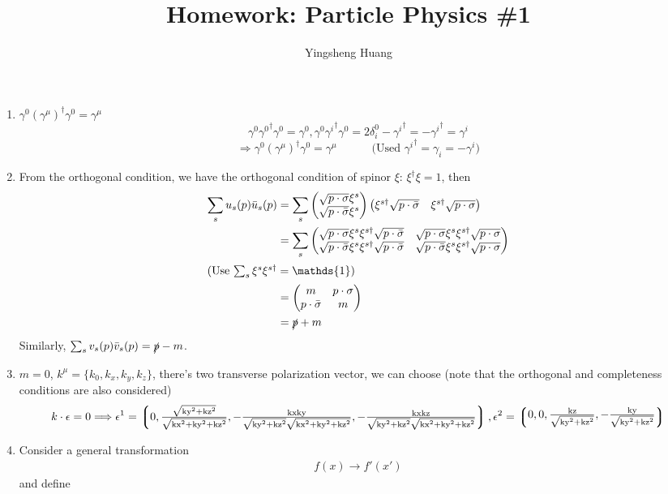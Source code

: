 \documentclass{article}
\title{Homework: Particle Physics \#1}
\author{Yingsheng Huang}
\newcommand{\gm}{\gamma^{\mu}}
\newcommand{\g}{\gamma}
\newcommand{\p}{\phi}
\newcommand{\ps}{\slashed p}
\begin{document}
\maketitle
\begin{enumerate}[\bf1.]
  \item $\g^0(\gm)^{\dagger}\g^0=\gm$
  $$\g^0{\g^0}^{\dagger}\g^0=\g^0,\g^0{\g^i}^{\dagger}\g^0=2\delta^0_i-{\g^i}^{\dagger}=-{\g^i}^{\dagger}=\g^i$$
  $$\Longrightarrow \g^0(\gm)^{\dagger}\g^0=\gm\;\;\;\;\;\;\;\;\;\;\;\text{(Used ${\g^i}^{\dagger}=\g_i=-\g^i$)}$$
  \item From the orthogonal condition, we have the orthogonal condition of spinor $\xi$: $\xi^{\dagger}\xi=1$, then
  \begin{align*}
    \sum_su_s(p)\bar u_s(p)&=\sum_s\pmqty{\sqrt{p\cdot\sigma}\xi^s\\\sqrt{p\cdot\bar\sigma}\xi^s}\pmqty{\xi^{s\dagger}\sqrt{p\cdot\bar\sigma}&\xi^{s\dagger}\sqrt{p\cdot\sigma}}\\
    &=\sum_s\pmqty{\sqrt{p\cdot\sigma}\xi^s\xi^{s\dagger}\sqrt{p\cdot\bar\sigma}&\sqrt{p\cdot\sigma}\xi^s\xi^{s\dagger}\sqrt{p\cdot\sigma}\\\sqrt{p\cdot\bar\sigma}\xi^s\xi^{s\dagger}\sqrt{p\cdot\bar\sigma}&\sqrt{p\cdot\bar\sigma}\xi^s\xi^{s\dagger}\sqrt{p\cdot\sigma}}\\
    \intertext{(Use $\sum_s\xi^s\xi^{s\dagger}=\mathds{1}$)}
    &=\pmqty{m&p\cdot\sigma\\p\cdot\bar\sigma&m}\\
    &=\ps+m
  \end{align*}
  Similarly, $\sum_sv_s(p)\bar v_s(p)=\ps-m$.
  \item $m=0$, $k^{\mu}=\{k_0,k_x,k_y,k_z\}$, there's two transverse polarization vector, we can choose (note that the orthogonal and completeness conditions are also considered)
  $$k\cdot \epsilon=0\Longrightarrow \epsilon^1=\Pmqty{0,\frac{\sqrt{\text{ky}^2+\text{kz}^2}}{\sqrt{\text{kx}^2+\text{ky}^2+\text{kz}^2}},-\frac{\text{kx} \text{ky}}{\sqrt{\text{ky}^2+\text{kz}^2} \sqrt{\text{kx}^2+\text{ky}^2+\text{kz}^2}},-\frac{\text{kx} \text{kz}}{\sqrt{\text{ky}^2+\text{kz}^2} \sqrt{\text{kx}^2+\text{ky}^2+\text{kz}^2}}},\epsilon^2=\Pmqty{0,0,\frac{\text{kz}}{\sqrt{\text{ky}^2+\text{kz}^2}},-\frac{\text{ky}}{\sqrt{\text{ky}^2+\text{kz}^2}}}$$
  \item Consider a general transformation
  \begin{align*}
    f(x)\rightarrow f'(x')
  \end{align*}
  and define
  \begin{align*}

\end{align*}
\end{enumerate}
\end{document}
